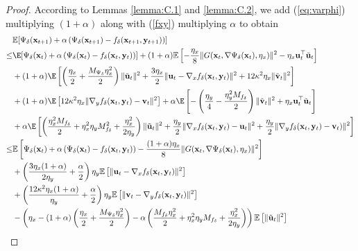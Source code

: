\documentclass[11pt]{article}
\def\vu{\mathbf{u}}
\def\vv{\mathbf{v}}
\def\vx{\mathbf{x}}
\def\vy{\mathbf{y}}
\def\BE{{\mathbb{E}}}
\begin{document}
\begin{proof}
According to Lemmas \ref{lemma:C.1} and \ref{lemma:C.2}, we add (\ref{eq:varphi}) multiplying $(1+\alpha)$ along with (\ref{fxy}) multiplying $\alpha$ to obtain
\begin{align}
& \BE[\Psi_{\delta}(\vx_{t+1})  + \alpha \left( \Psi_{\delta}(\vx_{t+1}) - f_{\delta}(\vx_{t+1}, \vy_{t+1})\right)] \nonumber\\
 \le&  \E[\Psi_{\delta}(\vx_t)  + \alpha \left( \Psi_{\delta}(\vx_{t}) - f_{\delta}(\vx_{t}, \vy_{t})\right)]
+ (1+\alpha) \mathbb{E}\left[  -\frac{\eta_x}{8}\Vert   G(\vx_t,\nabla\Psi_\delta(\vx_t),\eta_x) \Vert^2-\eta_x\vu_t^\top\tilde{\vu}_t\right] \nonumber\\
&+
(1+\alpha)\E\left[\left(\frac{\eta_x}{2}+\frac{M_{\Psi_\delta} \eta_x^2 }{2}\right) \Vert   \tilde{\vu}_t\Vert^2
 +\frac{3\eta_x}{2} \|\vu_t-\nabla_x f_\delta(\vx_t,\vy_t)\|^2
+12\kappa^2\eta_x\|\tilde{\vv}_t\|^2\right] \nonumber\\
 &+(1+\alpha)\E\left[12\kappa^2\eta_x\|\nabla_y f_\delta(\vx_t,\vy_t)-\vv_t\|^2\right] 
 +\alpha \E\left[ - \left(\frac{\eta_y}{4} - \frac{\eta_y^2 M_{f_\delta}}{2}\right) \Vert \tilde{\vv}_t   \Vert^2 +\eta_x \vu_t^\top\tilde{\vu}_t\right]  \nonumber\\
& + \alpha \E\left[ \left(\frac{\eta_x^2 M_{f_\delta}}{2} + \eta_x^2 \eta_y M_{f_\delta}^2 +\frac{ \eta_x^2}{2\eta_y} \right) \Vert   \tilde{\vu}_t \Vert^2 
+ \frac{\eta_y}{2} \Vert \nabla_x f_{\delta}(  \vx_t,\mathbf{y}_t ) -   \vu_t \Vert^2 + \frac{\eta_y}{2} \Vert\nabla_y f_{\delta}(  \vx_t, \mathbf{y}_t )- \mathbf{v}_t ) \Vert^2
\right] \nonumber\\
\le & \mathbb{E} \left[ \Psi_{\delta}(\vx_t)  + \alpha \left( \Psi_{\delta}(\vx_{t}) - f_{\delta}(\vx_{t}, \vy_{t})\right) - \frac{(1+\alpha)\eta_x}{8} \Vert G(\vx_t,\nabla\Psi_\delta(\vx_t),\eta_x)  \Vert^2\right] \nonumber\\
& + \left(\frac{3\eta_x(1+\alpha)}{2\eta_y} + \frac{\alpha}{2}\right) \eta_y \mathbb{E}\left[ \Vert   \vu_t  - \nabla_x f_{\delta}(  \vx_t, \mathbf{y}_t  ) \Vert^2\right] \nonumber\\
& + \left( \frac{12 \kappa^2 \eta_x(1+\alpha)}{\eta_y} + \frac{\alpha}{2} \right) \eta_y\mathbb{E}\left[ \Vert \mathbf{v}_t  - \nabla_y f_{\delta}(  \vx_t, \mathbf{y}_t  ) \Vert^2\right] \nonumber\\
& - \left(\eta_x- (1+\alpha) \left(\frac{\eta_x}{2} + \frac{M_{\Psi_\delta} \eta_x^2}{2} \right) - \alpha \left( \frac{M_{f_\delta}\eta_x^2 }{2} +\eta_x^2 \eta_y M_{f_\delta}   +\frac{ \eta_x^2}{2\eta_y} \right) \right) \mathbb{E}\left[  \Vert   \tilde{\vu}_t \Vert^2 \right] \nonumber\\

\end{align}
\end{proof}
\end{document}
